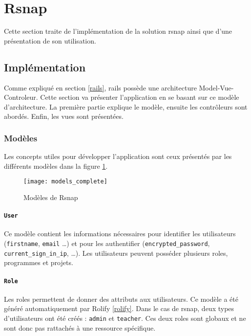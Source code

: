 \section{Rsnap}
\graphicspath{{content/7-solution/3-rsnap/images/}}
Cette section traite de l'implémentation de la solution \gls{rsnap} ainsi que d'une présentation de son utilisation.

\subsection{Implémentation}
Comme expliqué en section \ref{rails}, \gls{rails} possède une architecture Model-Vue-Controleur. Cette section va présenter l'application en se basant sur ce modèle d'architecture. La première partie explique le modèle, ensuite les contrôleurs sont abordés. Enfin, les vues sont présentées.

\subsubsection{Modèles}
Les concepts utiles pour développer l'application sont ceux présentés par les différents modèles dans la figure \ref{fig:models}.

\begin{figure}
 \begin{center}
   \texttt{[image: models\_complete]}
   \caption{Modèles de Rsnap}
   \label{fig:models}
 \end{center}
\end{figure}

\paragraph{\texttt{User}} Ce modèle contient les informations nécessaires pour identifier les utilisateurs (\texttt{firstname}, \texttt{email} \ldots) et pour les authentifier (\texttt{encrypted\_password}, \texttt{current\_sign\_in\_ip}, \ldots). Les utilisateurs peuvent posséder plusieurs \glspl{role}, programmes et projets.

\paragraph{\texttt{Role}} Les \glspl{role} permettent de donner des attributs aux utilisateurs. Ce modèle a été généré automatiquement par Rolify \ref{rolify}. Dans le cas de \gls{rsnap}, deux types d'utilisateurs ont été créés : \texttt{admin} et \texttt{teacher}. Ces deux \glspl{role} sont globaux et ne sont donc pas rattachés à une ressource spécifique.


